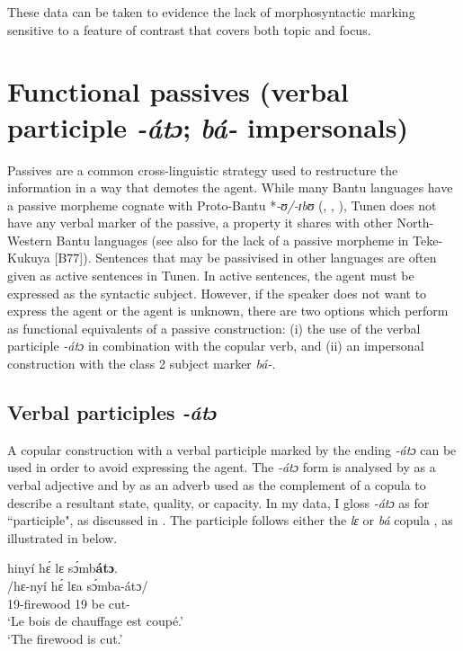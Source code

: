 \documentclass[output=paper,colorlinks,citecolor=brown
]{langscibook}
\begin{document}
\z

These data can be taken to evidence the lack of morphosyntactic marking sensitive to a feature of contrast that covers both topic and focus.


\section{Functional passives (verbal participle \textit{-átɔ}; \textit{bá-} impersonals)} \label{secpassive}
Passives are a common cross-linguistic strategy used to restructure the information in a way that demotes the agent. While many Bantu languages have a passive morpheme cognate with Proto-Bantu *\textit{-ʊ/-ɪbʊ} (\citealp{Stappers1967}, \citealp[78--79]{Schadeberg2003}, \citealp{GuéroisFut}), Tunen does not have any verbal marker of the passive, a property it shares with other North-Western Bantu languages (see also \cite{chapters/teke} for the lack of a passive morpheme in Teke-Kukuya [B77]). Sentences that may be passivised in other languages are often given as active sentences in Tunen. In active sentences, the agent must be expressed as the syntactic subject. However, if the speaker does not want to express the agent or the agent is unknown, there are two options which perform as functional equivalents of a passive construction: (i) the use of the verbal participle \textit{-átɔ} in combination with the copular verb, and (ii) an impersonal construction with the class 2 subject marker \textit{bá-}.

\subsection{Verbal participles \textit{-átɔ}}

A copular construction with a verbal participle marked by the ending \textit{-átɔ} can be used in order to avoid expressing the agent. The \textit{-átɔ} form is analysed by \citet[362]{Dugast1971} as a verbal adjective and by \citet{Mous2003} as an adverb used as the complement of a copula to describe a resultant state, quality, or capacity. In my data, I gloss \textit{-átɔ} as \PTCP{} for ``participle", as discussed in \citet[109]{KerrFut}. The participle follows either the \textit{lɛ} or \textit{bá} copula \citep[362]{Dugast1971}, as illustrated in  below.

\ea \label{atoset}
\ea
\label{cutwoodato}
\glll
{\db}hinyí hɛ́ lɛ sɔ́mb\textbf{átɔ}. \\
/hɛ-nyí hɛ́ lɛa sɔ́mba-átɔ/ \\
{\db}19-firewood 19\SM{} be cut-\PTCP{} \\
\glt
`Le bois de chauffage est coupé.' \\ `The firewood is cut.' \jambox*{[EE+EB 1671] }
\end{document}

